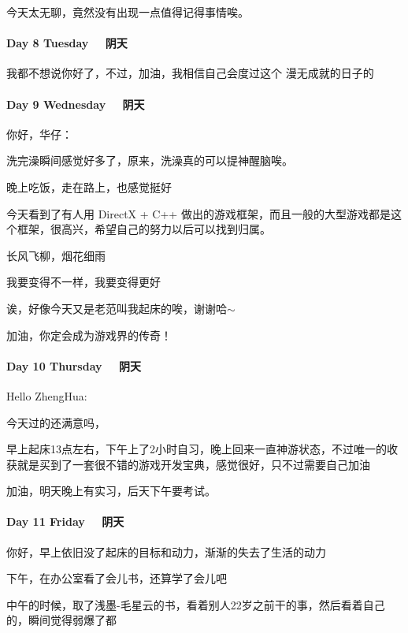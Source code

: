 \documentclass[UTF8,a4paper,8pt]{ctexart}
\begin{document}
       今天太无聊，竟然没有出现一点值得记得事情唉。
       
       \paragraph{Day 8  Tuesday \ \  阴天 }
       
       我都不想说你好了，不过，加油，我相信自己会度过这个 漫无成就的日子的
       
       
       \paragraph{Day 9  Wednesday \ \  阴天 }
       你好，华仔：
       
       洗完澡瞬间感觉好多了，原来，洗澡真的可以提神醒脑唉。
       
       晚上吃饭，走在路上，也感觉挺好
       
       今天看到了有人用 DirectX + C++ 做出的游戏框架，而且一般的大型游戏都是这个框架，很高兴，希望自己的努力以后可以找到归属。
       
       长风飞柳，烟花细雨
       
       我要变得不一样，我要变得更好
       
       
       诶，好像今天又是老范叫我起床的唉，谢谢哈$\sim$
       
       加油，你定会成为游戏界的传奇！
       
       \paragraph{Day 10 Thursday \ \ 阴天}
       Hello ZhengHua:
       
       今天过的还满意吗，
       
       早上起床13点左右，下午上了2小时自习，晚上回来一直神游状态，不过唯一的收获就是买到了一套很不错的游戏开发宝典，感觉很好，只不过需要自己加油
       
       加油，明天晚上有实习，后天下午要考试。
       
       \paragraph{Day 11 Friday \ \ 阴天}
       
       你好，早上依旧没了起床的目标和动力，渐渐的失去了生活的动力
       
       下午，在办公室看了会儿书，还算学了会儿吧
       
       中午的时候，取了浅墨-毛星云的书，看着别人22岁之前干的事，然后看着自己的，瞬间觉得弱爆了都
       
\end{document}
